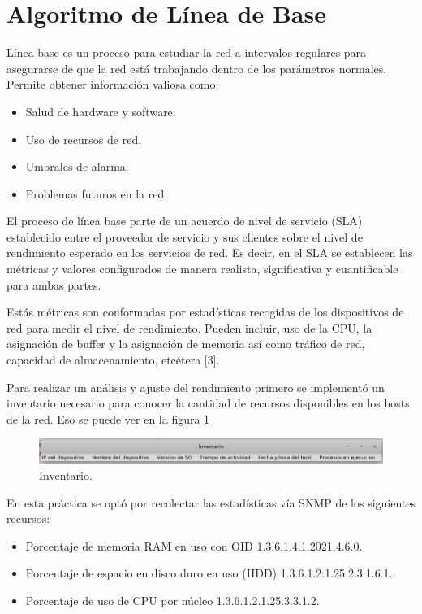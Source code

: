 \section{Algoritmo de Línea de Base}
Línea base es un proceso para estudiar la red a intervalos regulares para asegurarse de que la red está trabajando dentro de los parámetros normales. Permite obtener información valiosa como:

\begin{itemize}
	\item Salud de hardware y software.
	\item Uso de recursos de red.
	\item Umbrales de alarma.
	\item Problemas futuros en la red.
\end{itemize}

El proceso de línea base parte de un acuerdo de nivel de servicio (SLA) establecido entre el proveedor de servicio y sus clientes sobre el nivel de rendimiento esperado en los servicios de red. Es decir, en el SLA se establecen las métricas y valores configurados de manera realista, significativa y cuantificable para ambas partes.

Estás métricas son conformadas por estadísticas recogidas de los dispositivos de red para medir el nivel de rendimiento. Pueden incluir, uso de la CPU, la asignación de buffer y la asignación de memoria así como tráfico de red, capacidad de almacenamiento, etcétera [3].

Para realizar un análisis y ajuste del rendimiento primero se implementó un inventario necesario para conocer la cantidad de recursos disponibles en los hosts de la red. Eso se puede ver en la figura \ref{image:inventario}

\FloatBarrier
\begin{figure}[htbp!]
		\centering
			\includegraphics[width=.9 \textwidth]{images/inventario}
		\caption{Inventario.}
		\label{image:inventario}
\end{figure}
\FloatBarrier

En esta práctica se optó por recolectar las estadísticas vía SNMP de los siguientes recursos:

\begin{itemize}
	\item Porcentaje de memoria RAM en uso con OID 1.3.6.1.4.1.2021.4.6.0.
	\item Porcentaje de espacio en disco duro en uso (HDD) 1.3.6.1.2.1.25.2.3.1.6.1.
	\item Porcentaje de uso de CPU por núcleo 1.3.6.1.2.1.25.3.3.1.2.
\end{itemize}

